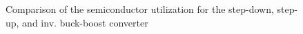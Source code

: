 \begin{frame}
\begin{columns}
\begin{column}{0.6\textwidth}
\begin{figure}
                \caption{Comparison of the semiconductor utilization for the step-down, step-up, and inv. buck-boost converter}
                \label{fig:semiconductor-utilization-summary}
            \end{figure}
        \end{column}
    \end{columns}
\end{frame}


